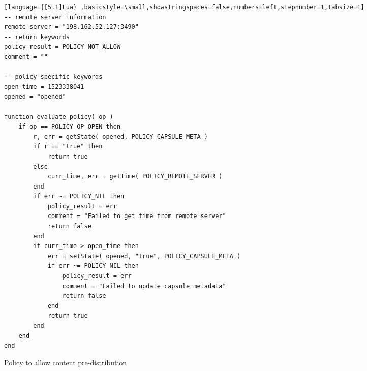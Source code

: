 

\begin{figure*}[t]
\begin{lstlisting}[language={[5.1]Lua} ,basicstyle=\small,showstringspaces=false,numbers=left,stepnumber=1,tabsize=1]
-- remote server information
remote_server = "198.162.52.127:3490"
-- return keywords
policy_result = POLICY_NOT_ALLOW
comment = ""

-- policy-specific keywords
open_time = 1523338041
opened = "opened"

function evaluate_policy( op )
    if op == POLICY_OP_OPEN then
        r, err = getState( opened, POLICY_CAPSULE_META )
        if r == "true" then
            return true
        else
            curr_time, err = getTime( POLICY_REMOTE_SERVER )
        end
        if err ~= POLICY_NIL then
            policy_result = err
            comment = "Failed to get time from remote server"
            return false
        end
        if curr_time > open_time then
            err = setState( opened, "true", POLICY_CAPSULE_META )
            if err ~= POLICY_NIL then
                policy_result = err
                comment = "Failed to update capsule metadata"
                return false
            end
            return true
        end
    end
end
\end{lstlisting}
\caption{Policy to allow content pre-distribution}
\label{fig:time_based_access}
\end{figure*}

